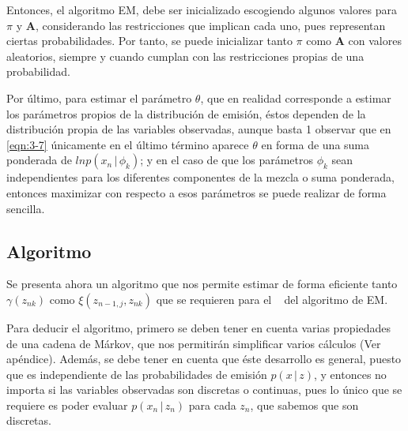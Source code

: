 Entonces, el algoritmo EM, debe ser inicializado escogiendo algunos valores para $\pi$ y $\mathbf{A}$, considerando las restricciones que implican cada uno, pues representan ciertas probabilidades. Por tanto, se puede inicializar tanto $\pi$ como $\mathbf{A}$ con valores aleatorios, siempre y cuando cumplan con las restricciones propias de una probabilidad. 

Por último, para estimar el parámetro $\theta$, que en realidad corresponde a estimar los parámetros propios de la distribución de emisión, éstos dependen de la distribución propia de las variables observadas, aunque basta 1 observar que en \eqref{eqn:3-7} únicamente en el último término aparece $\theta$ en forma de una suma ponderada de $ln p(x_n \,|\,  \phi_k)$; y en el caso de que los parámetros $\phi_k$ sean independientes para los diferentes componentes de la mezcla o suma ponderada, entonces maximizar con respecto a esos parámetros se puede realizar de forma sencilla.

\subsection{Algoritmo \abf}

Se presenta ahora un algoritmo que nos permite estimar de forma eficiente tanto $\gamma(z_{nk})$ como $\xi(z_{n-1, j}, z_{nk})$ que se requieren para el \estep~ del algoritmo de EM.

Para deducir el algoritmo, primero se deben tener en cuenta varias propiedades de una cadena de Márkov, que nos permitirán simplificar varios cálculos (Ver apéndice). Además, se debe tener en cuenta que éste desarrollo es general, puesto que es independiente de las probabilidades de emisión $p(x \,|\, z)$, y entonces no importa si las variables observadas son discretas o continuas, pues lo único que se requiere es poder evaluar $p(x_n \,|\, z_n)$ para cada $z_n$, que sabemos que son discretas.

